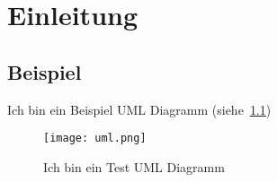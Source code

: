 
\chapter{Einleitung}

\section{Beispiel}
Ich bin ein Beispiel UML Diagramm (siehe~\ref{fig:TestUml})

\begin{figure}
    \texttt{[image: uml.png]}
    \caption{Ich bin ein Test UML Diagramm}
    \label{fig:TestUml}
\end{figure}

\cite{test}